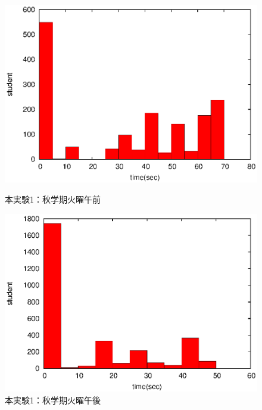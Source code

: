 \documentclass[a4paper,10pt]{jarticle}
\begin{document}
\begin{figure}[htpb]                        
\begin{minipage} {0.5\hsize}                             
\begin{center}                              
\includegraphics[bb=0 0 390 248,clip,width=\hsize]{xTu12_hist.eps}   
\caption{本実験1：秋学期火曜午前}                              
\label{xTu12}                                
\end{center}                                    
\end{minipage}                                 
\begin{minipage}{0.5\hsize}                                            
\begin{center}                              
\includegraphics[bb=0 0 390 248,clip,width=\hsize]{xTu345_hist.eps}   
\caption{本実験1：秋学期火曜午後}                              
\label{xTu345}                                
\end{center}                                    
\end{minipage}                                 
\end{figure}                                 
\end{document}
